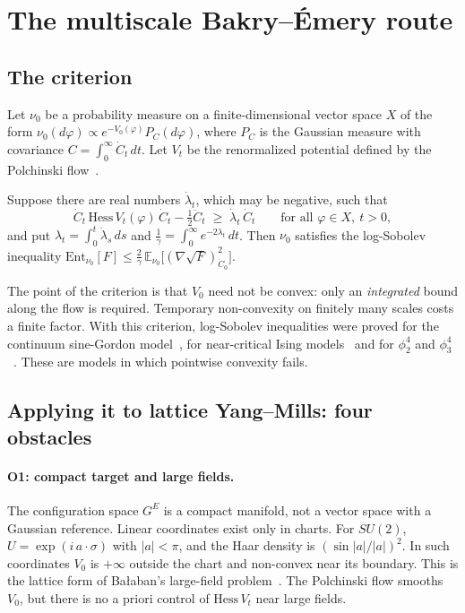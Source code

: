 \documentclass[11pt,a4paper]{article}
\newcommand{\idref}[1]{\textsf{#1}}
\begin{document}
\section{The multiscale Bakry--Émery route}\label{sec:mbe}

\subsection{The criterion}
Let $\nu_0$ be a probability measure on a finite-dimensional vector space $X$ of the form $\nu_0(d\varphi)\propto e^{-V_0(\varphi)}P_C(d\varphi)$, where $P_C$ is the Gaussian measure with covariance $C=\int_0^\infty\dot C_t\,dt$. Let $V_t$ be the renormalized potential defined by the Polchinski flow~\cite{Pol84}.

\begin{importedtheorem}[{\cite[Thm.~3.6]{BBD24}}; \idref{A-041}]\label{thm:bbd}
Suppose there are real numbers $\dot\lambda_t$, which may be negative, such that
\[
\dot C_t\,\mathrm{Hess}\,V_t(\varphi)\,\dot C_t-\tfrac12\ddot C_t\;\ge\;\dot\lambda_t\,\dot C_t\qquad\text{for all }\varphi\in X,\ t>0,
\]
and put $\lambda_t=\int_0^t\dot\lambda_s\,ds$ and $\frac1\gamma=\int_0^\infty e^{-2\lambda_t}\,dt$. Then $\nu_0$ satisfies the log-Sobolev inequality $\mathrm{Ent}_{\nu_0}[F]\le\frac2\gamma\,\mathbb E_{\nu_0}\bigl[(\nabla\sqrt F)^2_{\dot C_0}\bigr]$.
\end{importedtheorem}

The point of the criterion is that $V_0$ need not be convex: only an \emph{integrated} bound along the flow is required. Temporary non-convexity on finitely many scales costs a finite factor. With this criterion, log-Sobolev inequalities were proved for the continuum sine-Gordon model~\cite{BB20}, for near-critical Ising models~\cite{BD23a} and for $\phi^4_2$ and $\phi^4_3$~\cite{BD23b}. These are models in which pointwise convexity fails.

\subsection{Applying it to lattice Yang--Mills: four obstacles}

\paragraph{O1: compact target and large fields.} The configuration space $G^E$ is a compact manifold, not a vector space with a Gaussian reference. Linear coordinates exist only in charts. For $SU(2)$, $U=\exp(i\,a\cdot\sigma)$ with $|a|<\pi$, and the Haar density is $(\sin|a|/|a|)^2$. In such coordinates $V_0$ is $+\infty$ outside the chart and non-convex near its boundary. This is the lattice form of Ba{\l}aban's large-field problem~\cite{Bal89a,Bal89b}. The Polchinski flow smooths $V_0$, but there is no a priori control of $\mathrm{Hess}\,V_t$ near large fields.
\end{document}
